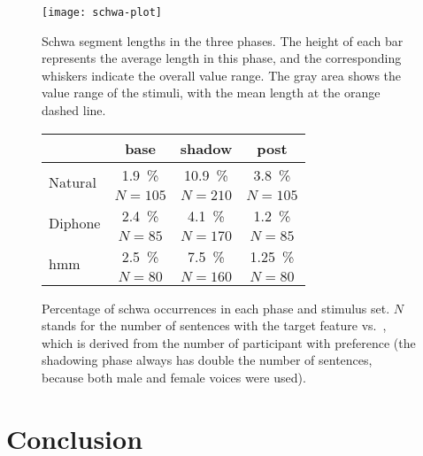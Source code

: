 \begin{figure}[t]
	\begin{minipage}{.48\linewidth}
			\centering
			\texttt{[image: schwa-plot]}
			\caption[Illustration]
				{Schwa segment lengths in the three phases.
				 The height of each bar represents the average length in this phase, and the corresponding whiskers indicate the overall value range.
				 The gray area shows the value range of the stimuli, with the mean length at the orange dashed line.}
			\label{fig:schwa_conv_bars}
	\end{minipage}
	\hfill
	\begin{minipage}{.49\linewidth}
			\centering
			\captionsetup{type=table}
			\caption[Convergence results for \textipa{[\s{n}]} vs.\ \textipa{[@n]} with three stimuli sets]
				{Percentage of schwa occurrences in each phase and stimulus set.
				 $N$ stands for the number of sentences with the target feature \textipa{[\s{n}]} vs.\ \textipa{[@n]}, which is derived from the number of participant with \textipa{[\s{n}]} preference (the shadowing phase always has double the number of sentences, because both male and female voices were used).}
			\label{tab:schwa_results}
			\begin{tabularx}{\linewidth}{lccc}
				\toprule
				& \textbf{base} & \textbf{shadow} & \textbf{post} \\
				\midrule
				\multirow{2}{1.4cm}{Natural}	& \SI{1.9}{\percent} & \SI{10.9}{\percent} & \SI{3.8}{\percent}  \\\vspace{0.3cm}
											& $ N = 105 $ 		 & $ N = 210 $		   & $ N = 105 $		 \\
				\multirow{2}{1.4cm}{Diphone} 	& \SI{2.4}{\percent} & \SI{4.1}{\percent}  & \SI{1.2}{\percent}  \\\vspace{0.3cm}
											& $ N = 85 $ 		 & $ N = 170 $ 		   & $ N = 85 $			 \\
				\multirow{2}{1.4cm}{\acs{hmm}} 	& \SI{2.5}{\percent} & \SI{7.5}{\percent}  & \SI{1.25}{\percent} \\
											& $ N = 80 $ 		 & $ N = 160 $ 		   & $ N = 80 $			 \\
				\bottomrule
			\end{tabularx}
	\end{minipage}
\end{figure}

\section{Conclusion}
\label{sec:conclusion_shadowing}

